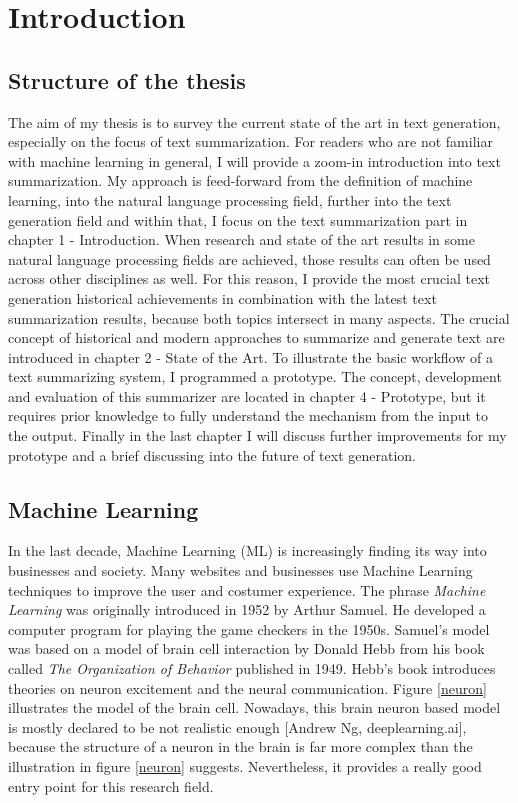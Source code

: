 \chapter{Introduction}\label{ch:intro}
\section{Structure of the thesis}
The aim of my thesis is to survey the current state of the art in text generation, especially on the focus of text summarization. For readers who are not familiar with machine learning in general, I will provide a zoom-in introduction into text summarization. My approach is feed-forward from the definition of machine learning, into the natural language processing field, further into the text generation field and within that, I focus on the text summarization part in chapter 1 - Introduction. When research and state of the art results in some natural language processing fields are achieved, those results can often be used across other disciplines as well. For this reason, I provide the most crucial text generation historical achievements in combination with the latest text summarization results, because both topics intersect in many aspects. The crucial concept of historical and modern approaches to summarize and generate text are introduced in chapter 2 - State of the Art. 
To illustrate the basic workflow of a text summarizing system, I programmed a prototype. The concept, development and evaluation of this summarizer are located in chapter 4 - Prototype, but it requires prior knowledge to fully understand the mechanism from the input to the output. Finally in the last chapter I will discuss further improvements for my prototype and a brief discussing into the future of text generation.

\section{Machine Learning}
In the last decade, Machine Learning (ML) is increasingly finding its way into businesses and society. Many websites and businesses use Machine Learning techniques to improve the user and costumer experience. The phrase \textit{Machine Learning} was originally introduced in 1952 by Arthur Samuel. He developed a computer program for playing the game checkers in the 1950s. Samuel's model was based on a model of brain cell interaction by Donald Hebb from his book called \textit{The Organization of Behavior} published in 1949. Hebb's book introduces theories on neuron excitement and the neural communication. Figure \ref{neuron} illustrates the model of the brain cell. Nowadays, this brain neuron based model is mostly declared to be not realistic enough [Andrew Ng, deeplearning.ai], because the structure of a neuron in the brain is far more complex than the illustration in figure \ref{neuron} suggests. Nevertheless, it provides a really good entry point for this research field. 

